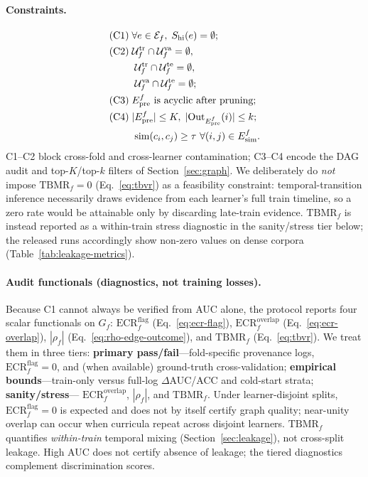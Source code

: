 \documentclass[pdflatex,sn-mathphys-num]{sn-jnl}
\newcommand{\Epre}{\ensuremath{E_{\text{pre}}}}
\newcommand{\Esim}{\ensuremath{E_{\text{sim}}}}
\begin{document}
\paragraph{Constraints.}
\begin{align}
\text{(C1)} \;& \forall e\in\mathcal{E}_f,\;
  S_{\mathrm{hi}}(e)=\emptyset;
  \label{eq:c1}\\
\text{(C2)} \;& \mathcal{U}^{\mathrm{tr}}_f \cap \mathcal{U}^{\mathrm{va}}_f
  = \emptyset,\notag\\
&\; \mathcal{U}^{\mathrm{tr}}_f \cap \mathcal{U}^{\mathrm{te}}_f
  = \emptyset,\notag\\
&\; \mathcal{U}^{\mathrm{va}}_f \cap \mathcal{U}^{\mathrm{te}}_f
  = \emptyset;
  \label{eq:c2}\\
\text{(C3)} \;& \Epre^f \text{ is acyclic after pruning};
  \label{eq:c3}\\
\text{(C4)} \;& |\Epre^f|\le K,\;
  |\mathrm{Out}_{\Epre^f}(i)|\le k;\notag\\
&\; \mathrm{sim}(c_i,c_j)\ge\tau \ \forall (i,j)\in\Esim^f.
  \label{eq:c4}
\end{align}
C1--C2 block cross-fold and cross-learner contamination; C3--C4 encode
the DAG audit and top-$K$/top-$k$ filters of Section~\ref{sec:graph}.
We deliberately do \emph{not} impose $\mathrm{TBMR}_f{=}0$
(Eq.~\eqref{eq:tbvr}) as a feasibility constraint: temporal-transition
inference necessarily draws evidence from each learner's full train
timeline, so a zero rate would be attainable only by discarding
late-train evidence. $\mathrm{TBMR}_f$ is instead reported as a
within-train stress diagnostic in the sanity/stress tier below; the
released runs accordingly show non-zero values on dense corpora
(Table~\ref{tab:leakage-metrics}).

\paragraph{Audit functionals (diagnostics, not training losses).}
Because C1 cannot always be verified from AUC alone, the protocol
reports four scalar functionals on $G_f$:
$\mathrm{ECR}^{\mathrm{flag}}_f$ (Eq.~\eqref{eq:ecr-flag}),
$\mathrm{ECR}^{\mathrm{overlap}}_f$ (Eq.~\eqref{eq:ecr-overlap}),
$|\rho_f|$ (Eq.~\eqref{eq:rho-edge-outcome}), and
$\mathrm{TBMR}_f$ (Eq.~\eqref{eq:tbvr}). We treat them in three tiers:
\textbf{primary pass/fail}---fold-specific provenance logs,
$\mathrm{ECR}^{\mathrm{flag}}_f{=}0$, and (when available) ground-truth
cross-validation; \textbf{empirical bounds}---train-only versus full-log
$\Delta$AUC/ACC and cold-start strata; \textbf{sanity/stress}---
$\mathrm{ECR}^{\mathrm{overlap}}_f$, $|\rho_f|$, and $\mathrm{TBMR}_f$.
Under learner-disjoint splits, $\mathrm{ECR}^{\mathrm{flag}}_f{=}0$ is
expected and does not by itself certify graph quality; near-unity overlap
can occur when curricula repeat across disjoint learners. $\mathrm{TBMR}_f$
quantifies \emph{within-train} temporal mixing (Section~\ref{sec:leakage}),
not cross-split leakage. High AUC does not certify absence of leakage; the
tiered diagnostics complement discrimination scores.
\end{document}
